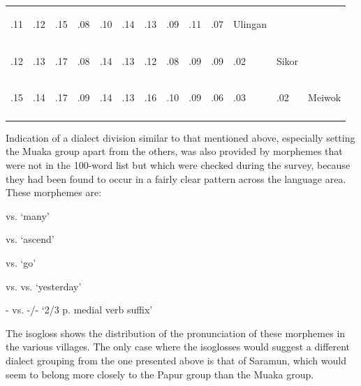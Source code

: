 \begin{table}
\begin{tabularx}{\textwidth}{lllllllllllll}
.11 & .12 & .15 & .08 & .10 & .14 & .13 & .09 & .11 & .07 &\begin{rotate}{0}{ Ulingan}\end{rotate} &  & \\

.12 & .13 & .17 & .08 & .14 & .13 & .12 & .08 & .09 & .09 & .02 & \begin{rotate}{0}{Sikor}\end{rotate} & \\

.15 & .14 & .17 & .09 & .14 & .13 & .16 & .10 & .09 & .06 & .03 & .02 & \begin{rotate}{0}{Meiwok}\end{rotate}	\\
\mybottomrule
\end{tabularx}
\end{table}
 

Indication of a dialect division similar to that mentioned above, especially setting the Muaka group apart from the others, was also provided by morphemes that were not in the 100-word list but which were checked during the survey, because they had been found to occur in a fairly clear pattern across the language area. These morphemes are:

    vs.        `many'

  vs.        `ascend'

    vs.        `go'

    vs.      vs.    `yesterday'

-   vs.  -/-      `2/3 p. medial verb suffix'

The isogloss  shows the distribution of the pronunciation of these morphemes in the various villages.  The only case where the isoglosses would suggest a different dialect grouping from the one presented above is that of Saramun, which would seem to belong more closely to the Papur group than the Muaka group.



